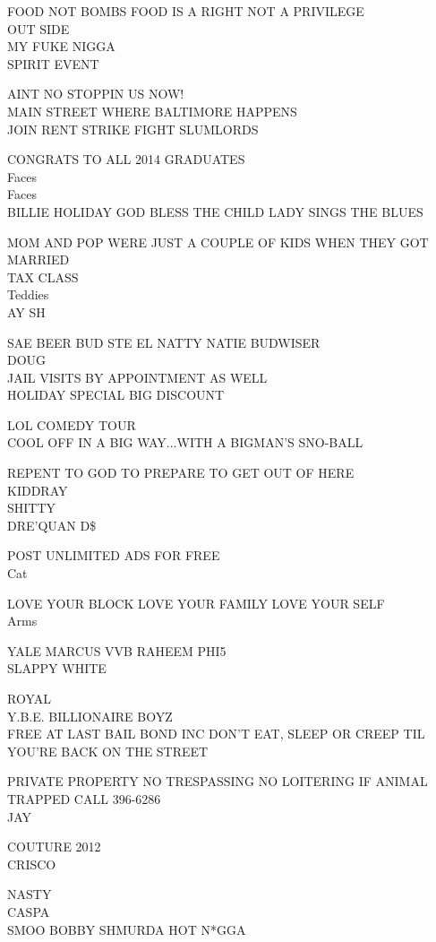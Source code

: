 \documentclass[10pt,letterpaper]{article}
\begin{document}
FOOD NOT BOMBS FOOD IS A RIGHT NOT A PRIVILEGE\\
OUT SIDE\\
MY FUKE NIGGA\\
SPIRIT EVENT

AINT NO STOPPIN US NOW!\\
MAIN STREET WHERE BALTIMORE HAPPENS\\
JOIN RENT STRIKE FIGHT SLUMLORDS

CONGRATS TO ALL 2014 GRADUATES\\
Faces\\
Faces\\
BILLIE HOLIDAY GOD BLESS THE CHILD LADY SINGS THE BLUES

MOM AND POP WERE JUST A COUPLE OF KIDS WHEN THEY GOT MARRIED\\
TAX CLASS\\
Teddies\\
AY SH

SAE BEER BUD STE EL NATTY NATIE BUDWISER\\
DOUG\\
JAIL VISITS BY APPOINTMENT AS WELL\\
HOLIDAY SPECIAL BIG DISCOUNT

LOL COMEDY TOUR\\
COOL OFF IN A BIG WAY...WITH A BIGMAN'S SNO{-}BALL

REPENT TO GOD TO PREPARE TO GET OUT OF HERE\\
KIDDRAY\\
SHITTY\\
DRE'QUAN D\$

POST UNLIMITED ADS FOR FREE\\
Cat

LOVE YOUR BLOCK LOVE YOUR FAMILY LOVE YOUR SELF\\
Arms

YALE MARCUS VVB RAHEEM PHI5\\
SLAPPY WHITE

ROYAL\\
Y.B.E. BILLIONAIRE BOYZ\\
FREE AT LAST BAIL BOND INC DON'T EAT, SLEEP OR CREEP TIL YOU'RE BACK ON THE STREET

PRIVATE PROPERTY NO TRESPASSING NO LOITERING IF ANIMAL TRAPPED CALL 396{-}6286\\
JAY

COUTURE 2012\\
CRISCO

NASTY\\
CASPA\\
SMOO BOBBY SHMURDA HOT N*GGA
\end{document}
